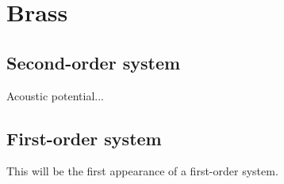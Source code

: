 \chapter{Brass}\label{ch:brass}

\section{Second-order system}

Acoustic potential...

\section{First-order system}

This will be the first appearance of a first-order system. 

